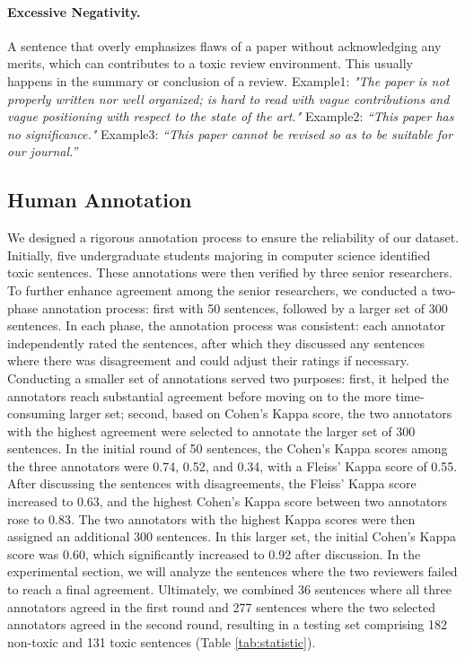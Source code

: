 \paragraph{Excessive Negativity.} A sentence that overly emphasizes flaws of a paper without acknowledging any merits, which can contributes to a toxic review environment. This usually happens in the summary or conclusion of a review.
Example1: \textit{"The paper is not properly written nor well organized; is hard to read with vague contributions and vague positioning with respect to the state of the art."} 
Example2: \textit{``This paper has no significance."}
Example3: \textit{``This paper cannot be revised so as to be suitable for our journal.''}

\subsection{Human Annotation}
\label{sec:human_annotation}
We designed a rigorous annotation process to ensure the reliability of our dataset. Initially, five undergraduate students majoring in computer science identified toxic sentences. These annotations were then verified by three senior researchers. To further enhance agreement among the senior researchers, we conducted a two-phase annotation process: first with 50 sentences, followed by a larger set of 300 sentences.
In each phase, the annotation process was consistent: each annotator independently rated the sentences, after which they discussed any sentences where there was disagreement and could adjust their ratings if necessary. Conducting a smaller set of annotations served two purposes: first, it helped the annotators reach substantial agreement before moving on to the more time-consuming larger set; second, based on Cohen's Kappa score, the two annotators with the highest agreement were selected to annotate the larger set of 300 sentences.
In the initial round of 50 sentences, the Cohen's Kappa scores among the three annotators were 0.74, 0.52, and 0.34, with a Fleiss' Kappa score of 0.55. After discussing the sentences with disagreements, the Fleiss' Kappa score increased to 0.63, and the highest Cohen's Kappa score between two annotators rose to 0.83. The two annotators with the highest Kappa scores were then assigned an additional 300 sentences. In this larger set, the initial Cohen's Kappa score was 0.60, which significantly increased to 0.92 after discussion.
In the experimental section, we will analyze the sentences where the two reviewers failed to reach a final agreement. Ultimately, we combined 36 sentences where all three annotators agreed in the first round and 277 sentences where the two selected annotators agreed in the second round, resulting in a testing set comprising 182 non-toxic and 131 toxic sentences (Table \ref{tab:statistic}). 

